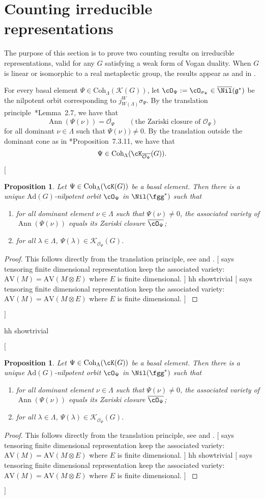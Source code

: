 \documentclass[12pt]{amsart}
\newcommand{\trivial}[2][]{\if\relax\detokenize{#1}\relax
  {%
      \color{orange} \vspace{0em}$[$#2$]$
      \color{black}
  }
  \else
\ifx#1h
\ifcsname showtrivial\endcsname
{%
    \color{orange}\vspace{0em}$[$#2$]$
    \color{black}
}
\fi
\else {\red Wrong argument!} \fi
\fi
}
\newcommand{\AV}{\mathrm{AV}}
\newcommand{\CK}{{\mathcal {K}}}
\newcommand{\CO}{{\mathcal {O}}}
\DeclareMathOperator{\Ann}{Ann}
\newcommand{\g}{\mathfrak g}
\numberwithin{equation}{section}
\newtheorem{prop}[thm]{Proposition}
\theoremstyle{remark}
\def\Coh{\mathrm{Coh}}
\def\Inn{\mathrm{Ad}}
\begin{document}
\section{Counting irreducible representations}\label{sec:counting}



The purpose of this section is to prove two counting results on irreducible representations, valid for any $G$ satisfying a weak form of Vogan duality. When $G$ is linear or isomorphic to a real metaplectic group, the results appear as  and  in .

For every  basal element $\Psi\in \Coh_\Lambda(\CK(G))$, let $\cO_\Psi:=\cO_{\sigma_{\Psi}}\in \overline \Nil(\g^*)$ be the nilpotent orbit corresponding to $j_{W(\Lambda)}^{W}\sigma_\Psi$.
By the translation principle~\cite{V1}*{Lemma~2.7}, we have that
 \[
 \Ann(\Psi(\nu)) = \overline{\CO_{\Psi}}\qquad (\textrm{the Zariski closure of $\CO_\Psi$})
 \]
 for all dominant $\nu\in \Lambda$ such that   $\Psi(\nu))\neq 0$.
By the translation outside the dominant cone as in \cite{Vg}*{Proposition~7.3.11}, we have that
\[
\Psi\in\Coh_\Lambda( \cK_{\overline{\CO_{\Psi}}}(G)).
\]






\trivial[h]{
\begin{prop}\label{asshc00}
Let  $\Psi\in \Coh_\Lambda(\cK(G))$ be a basal element.  %
Then there is a unique $\Inn(G)$-nilpotent orbit $\cO_\Psi$ in $\Nil(\fgg^*)$ such that
\begin{enumerate}[label=(\alph*),wide]
\item
 for all  dominant element $\nu\in \Lambda$ such that $\Psi(\nu)\neq 0$,
 the associated variety of $\Ann(\Psi(\nu))$ equals its Zariski closure $\overline{\cO_\Psi}$;
\item
for all $\lambda\in \Lambda$, $\Psi(\lambda)\in \CK_{\overline{\CO_{\Psi}}}(G)$.
\end{enumerate}
\end{prop}
\begin{proof}
  This follows directly from the translation principle, see
\cite[Lemma~2.7]{V1} and \cite[Lemma~4.3]{J2}.
\trivial[h]{\cite[Lemma~4.3]{J2} says tensoring finite dimensional representation keep the associated variety:
$\AV(M) = \AV(M\otimes E)$ where $E$ is finite dimensional.  }
\end{proof}
}
\end{document}
